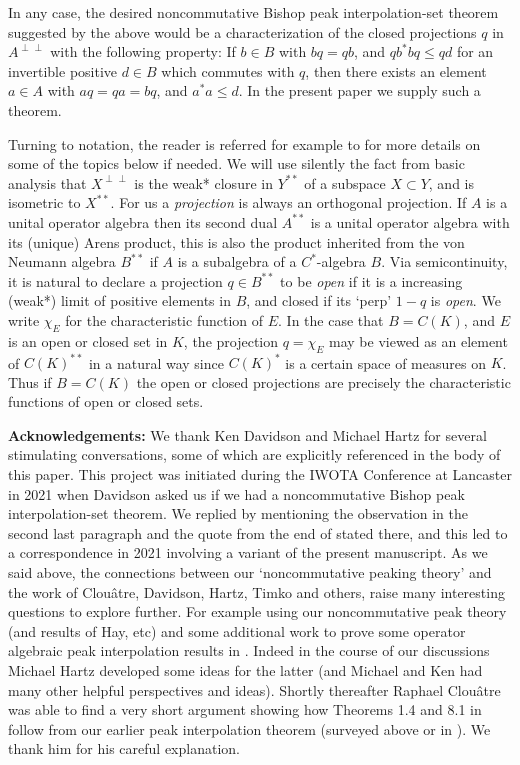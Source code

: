 \documentclass{amsart}
\theoremstyle{remark}
\theoremstyle{definition}
\numberwithin{equation}{section}
\begin{document}
In any case,  the desired noncommutative Bishop peak interpolation-set theorem  suggested by the above would be      a characterization of the 
closed projections $q$  in $A^{\perp \perp}$ with the following property:
If $b \in B$ with $b q= qb$,  and $q b^* b q  \leq q d$ for an invertible positive $d \in B$ which commutes with $q$,
then  there exists an element $a \in A$ with $a q =  q a = b q$, and $a^* a \leq d$.   
In the present paper we supply such a theorem. 

 

 Turning to notation, the reader is referred for example to \cite{BLM,BHN,BRI,Bnpi} for more details on
some of the topics below if needed.  We will use silently the fact from basic analysis that
$X^{\perp \perp}$ is the weak* closure in $Y^{**}$ of
a subspace  $X \subset
Y$, and is isometric to $X^{**}$.   For us a {\em projection}
is always an orthogonal projection.   If $A$ is a unital 
operator algebra then its 
second dual $A^{**}$ is  a unital operator algebra with its (unique)
Arens product, this is also the product inherited from the von Neumann
algebra $B^{**}$ if $A$ is a subalgebra of a $C^*$-algebra $B$. Via semicontinuity, it is natural 
to declare a projection  $q \in B^{**}$ to be {\em open} if it is a increasing (weak*) limit of 
positive elements in $B$, and closed if its `perp'  $1-q$ is {\em open}.   We write $\chi_E$ for
the characteristic function of $E$.   In the 
case that $B = C(K)$, and $E$ is an open or  closed set
 in $K$, the projection $q = \chi_E$  may be viewed as an element of $C(K)^{**}$ in a natural way since 
$C(K)^*$ is a certain space of measures on $K$.     Thus if $B = C(K)$
the open or closed projections are precisely the   characteristic functions of  open or  closed sets.

{\bf Acknowledgements:} We thank Ken Davidson and Michael Hartz for several stimulating conversations, some of which are explicitly referenced 
 in the body of this paper.   This project was initiated during the IWOTA Conference at Lancaster in 2021 when Davidson asked us
 if we had a noncommutative Bishop peak interpolation-set theorem.  
 We replied by mentioning the observation in the second last paragraph and the quote from the end of \cite{Bnpi} stated there, and this led to a correspondence in 2021  involving a 
 variant of the present manuscript.  As we said above, the connections between our `noncommutative peaking theory' and the  work of Clou\^atre, Davidson, Hartz, Timko and others, raise many interesting questions to explore further.  For example using our noncommutative peak theory (and results of Hay, etc) and some additional work
 to prove some operator algebraic peak interpolation results in \cite{DH}.  Indeed in the course of our discussions Michael Hartz developed some ideas for the latter (and Michael and Ken had many other helpful perspectives and ideas).
Shortly thereafter  Raphael Clou\^atre was able to find a very short argument showing how Theorems 1.4 and 8.1 in \cite{DH}
follow from our earlier peak interpolation theorem (surveyed above or  in \cite{Bnpi}).  We thank him for his careful 
 explanation.  
\end{document}
